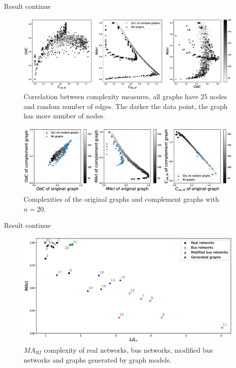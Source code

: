 \documentclass{beamer}
\begin{document}
    \begin{frame}{Result continue}
        \vspace{-5mm}
            \begin{figure}
                \includegraphics[width=\textwidth,height=0.5\textheight,keepaspectratio]{complexity_correlation.eps}
                \vspace{-10mm}
                \caption{Correlation between complexity measures, all graphs have 25 nodes and random number of edges. The darker the data point, the graph has more number of nodes.}
            \end{figure}
            \vspace{-15mm}
            \begin{figure}
                \includegraphics[width=\textwidth,height=0.5\textheight,keepaspectratio]{complement.eps}
                \caption{ Complexities of the original graphs and complement graphs with $n = 20$.}
            \end{figure}
    \end{frame}

    \begin{frame}{Result continue}
        \begin{figure}
            \includegraphics[width = \textwidth]{real_networks.eps}
            \caption{$MA_{RI}$ complexity of real networks, bus networks, modified bus networks and graphs generated by graph models.}
        \end{figure}
    \end{frame}
\end{document}
